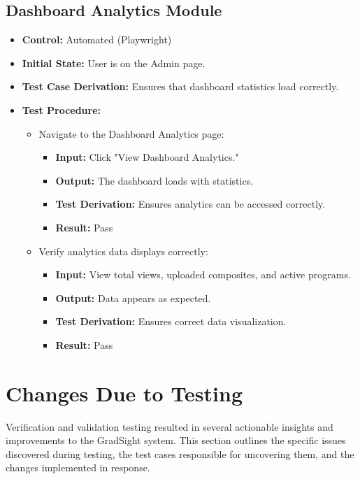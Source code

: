 \documentclass[12pt, titlepage]{article}
\begin{document}
\subsection{Dashboard Analytics Module}
\begin{itemize}
    \item \textbf{Control: }Automated (Playwright)
    \item \textbf{Initial State: }User is on the Admin page.
    \item \textbf{Test Case Derivation: }Ensures that dashboard statistics load correctly.
    \item \textbf{Test Procedure: }
    \begin{itemize}
        \item Navigate to the Dashboard Analytics page:
        \begin{itemize}
            \item \textbf{Input: }Click "View Dashboard Analytics."
            \item \textbf{Output: }The dashboard loads with statistics.
            \item \textbf{Test Derivation: }Ensures analytics can be accessed correctly.
            \item \textbf{Result: }Pass
        \end{itemize}
        \item Verify analytics data displays correctly:
        \begin{itemize}
            \item \textbf{Input: }View total views, uploaded composites, and active programs.
            \item \textbf{Output: }Data appears as expected.
            \item \textbf{Test Derivation: }Ensures correct data visualization.
            \item \textbf{Result: }Pass
        \end{itemize}
    \end{itemize}
\end{itemize}

\section{Changes Due to Testing}

Verification and validation testing resulted in several actionable insights and improvements to the GradSight system. This section outlines the specific issues discovered during testing, the test cases responsible for uncovering them, and the changes implemented in response.
\end{document}
